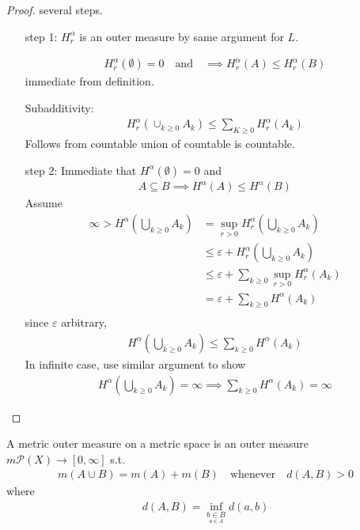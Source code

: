 \begin{proof} several steps.
	\begin{enumerate}
		\item[step 1:] $H_{r}^{\alpha}$ is an outer measure by same argument for $L$.

			\begin{align*}
			H_{r}^{\alpha} (\emptyset)= 0 \quad \text{and} \quad \implies H_{r}^{\alpha} (A) \leq H_{r}^{\alpha} (B)
			\end{align*} 
			immediate from definition.

			Subadditivity:
			\begin{align*}
			H_{r}^{\alpha} ( \cup_{k \geq 0} A_{k}) \leq \sum_{K \geq 0} H_{r}^{\alpha} (A_k)
			\end{align*} Follows from countable union of countable is countable.

		\item[step 2:] Immediate that $H^{\alpha} (\emptyset) = 0$ and 
			\begin{align*}
			A \subseteq B \implies H^{\alpha} (A) \leq H^{\alpha}(B)
			\end{align*} Assume
			\begin{align*}
				\infty > H^{\alpha}( \bigcup_{k \geq 0} A_k ) &= \sup_{r > 0} H_{r}^{\alpha} ( \bigcup_{k \geq 0} A_k) \\
															  &\leq \varepsilon + H_{r}^{\alpha} ( \bigcup_{k \geq 0} A_k) \\ 
															  &\leq \varepsilon +  \sum_{k \geq 0} \sup_{r > 0} H_{r}^{\alpha} ( A_k) \\ 
															  &= \varepsilon +  \sum_{k \geq 0} H^{\alpha} ( A_k) \\ 
			\end{align*} since $\varepsilon$ arbitrary, 
			\begin{align*}
			H^{\alpha} ( \bigcup_{k \geq 0} A_k) \leq \sum_{k \geq 0} H^{\alpha} ( A_k)
			\end{align*}
			In infinite case, use similar argument to show
		\begin{align*}
					H^{\alpha} ( \bigcup_{k \geq 0} A_k) = \infty \implies \sum_{k \geq 0} H^{\alpha} ( A_k) = \infty
		\end{align*} 
	\end{enumerate}
\end{proof}

\begin{definition}
	A metric outer measure on a metric space is an outer measure $m \mathcal{P}(X) \to [0,\infty]$ s.t. 
	\begin{align*}
	m(A \cup B) = m(A) + m(B) \quad \text{whenever} \quad d(A,B) > 0
	\end{align*} 
	where  
	\begin{align*}
		d(A,B) = \inf_{\underset{a \in A}{b \in B}} d(a,b)
	\end{align*} 
\end{definition}

